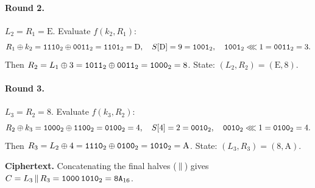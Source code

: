 \paragraph{Round 2.} $L_2 = R_1 = \mathrm{E}$. Evaluate $f(k_2, R_1)$:
\[
R_1 \oplus k_2 = \texttt{1110}_2 \oplus \texttt{0011}_2 = \texttt{1101}_2 = \mathrm{D},\quad
S[\mathrm{D}] = 9 = \texttt{1001}_2,\quad
\texttt{1001}_2 \lll 1 = \texttt{0011}_2 = 3.
\]
Then $R_2 = L_1 \oplus 3 = \texttt{1011}_2 \oplus \texttt{0011}_2 = \texttt{1000}_2 = 8$. State: $(L_2,R_2) = (\mathrm{E},8)$.

\paragraph{Round 3.} $L_3 = R_2 = 8$. Evaluate $f(k_3, R_2)$:
\[
R_2 \oplus k_3 = \texttt{1000}_2 \oplus \texttt{1100}_2 = \texttt{0100}_2 = 4,\quad
S[4] = 2 = \texttt{0010}_2,\quad
\texttt{0010}_2 \lll 1 = \texttt{0100}_2 = 4.
\]
Then $R_3 = L_2 \oplus 4 = \texttt{1110}_2 \oplus \texttt{0100}_2 = \texttt{1010}_2 = \mathrm{A}$. State: $(L_3,R_3) = (8,\mathrm{A})$.

\textbf{Ciphertext.} Concatenating the final halves ($\,\|\,$) gives $C = L_3 \,\|\, R_3 = \texttt{1000\,1010}_2 = \texttt{8A}_{16}$.


